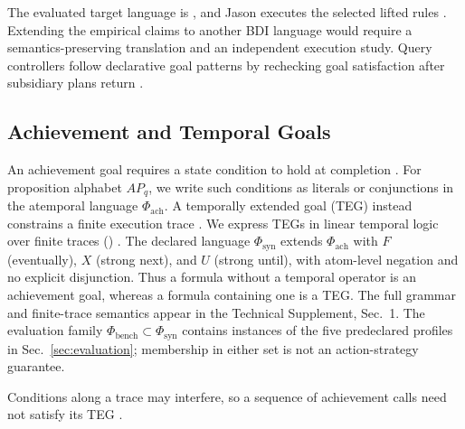 The evaluated target language is \asl{}, and Jason executes the selected lifted
rules \cite{Bordini2007Jason}. Extending the empirical claims to another BDI
language would require a semantics-preserving translation and an independent
execution study. Query controllers follow declarative goal patterns by
rechecking goal satisfaction after subsidiary plans return
\cite{Hubner2006DeclarativeGoals}.

\subsection{Achievement and Temporal Goals}

An achievement goal requires a state condition to hold at completion
\cite{Rao1996AgentSpeak,Sardina2007PlanFailure}. For proposition alphabet
$AP_q$, we write such conditions as literals or conjunctions in the atemporal
language $\Phi_{\mathrm{ach}}$. A temporally extended goal (TEG) instead
constrains a finite execution trace \cite{Hindriks2009TemporalGoals}. We express
TEGs in linear temporal logic over finite traces (\ltlf{})
\cite{DeGiacomoVardi2013}. The declared language $\Phi_{\mathrm{syn}}$ extends
$\Phi_{\mathrm{ach}}$ with $F$ (eventually), $X$ (strong next), and $U$ (strong
until), with atom-level negation and no explicit disjunction. Thus a formula
without a temporal operator is an achievement goal, whereas a formula containing
one is a TEG.
The full grammar and finite-trace semantics appear in the Technical Supplement,
Sec.~1. The evaluation family
$\Phi_{\mathrm{bench}}\subset\Phi_{\mathrm{syn}}$ contains instances of the
five predeclared profiles in Sec.~\ref{sec:evaluation}; membership in either
set is not an action-strategy guarantee.

Conditions along a trace may interfere, so a sequence of achievement calls need
not satisfy its TEG \cite{Thangarajah2003GoalInterference}.

